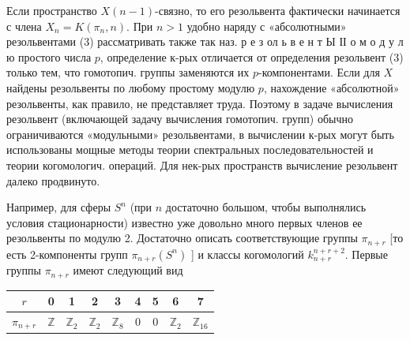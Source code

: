 \documentclass[10pt]{article}
\begin{document}
Если пространство $X(n-1)$-связно, то его резольвента фактически начинается с члена $X_{n}=K\left(\pi_{n}, n\right)$. При $n>1$ удобно наряду с «абсолютными» резольвентами (3) рассматривать также так наз. р е з ол ь в е н т Ы ІІ о м о д у л ю простого числа $p$, определение к-рых отличается от определения резольвент (3) только тем, что гомотопич. группы заменяются их $p$-компонентами. Если для $X$ найдены резольвенты по любому простому модулю $p$, нахождение «абсолютной» резольвенты, как правило, не представляет труда. Поэтому в задаче вычисления резольвент (включающей задачу вычисления гомотопич. групп) обычно ограничиваются «модульными» резольвентами, в вычислении к-рых могут быть использованы мощные методы теории спектральных последовательностей и теории когомологич. операций. Для нек-рых пространств вычисление резольвент далеко продвинуто.



Например, для сферы $S^{n}$ (при $n$ достаточно большом, чтобы выполнялись условия стационарности) известно уже довольно много первых членов ее резольвенты по модулю 2. Достаточно описать соответствующие группы $\pi_{n+r}$ [то есть 2-компоненты групп $\pi_{n+r}\left(S^{n}\right)$ ] и классы когомологий $k_{n+r}^{n+r+2}$. Первые группы $\pi_{n+r}$ имеют следующий вид



\begin{center}

\begin{tabular}{c|c|c|c|c|c|c|c|c}

$r$ & 0 & 1 & 2 & 3 & 4 & 5 & 6 & 7 \\

\hline

$\pi_{n+r}$ & $\mathbb{Z}$ & $\mathbb{Z}_{2}$ & $\mathbb{Z}_{2}$ & $\mathbb{Z}_{8}$ & 0 & 0 & $\mathbb{Z}_{2}$ & $\mathbb{Z}_{16}$ \\

\hline

\end{tabular}

\end{center}
\end{document}
